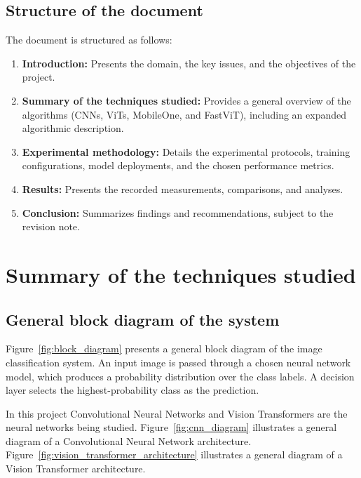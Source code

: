 \documentclass[12pt]{article}
\begin{document}
\subsection{Structure of the document}
The document is structured as follows:
\begin{enumerate}
    \item \textbf{Introduction:} Presents the domain, the key issues, and the objectives of the project.
    \item \textbf{Summary of the techniques studied:} Provides a general overview of the algorithms (CNNs, ViTs, MobileOne, and FastViT), including an expanded algorithmic description.
    \item \textbf{Experimental methodology:} Details the experimental protocols, training configurations, model deployments, and the chosen performance metrics.
    \item \textbf{Results:} Presents the recorded measurements, comparisons, and analyses.
    \item \textbf{Conclusion:} Summarizes findings and recommendations, subject to the revision note.
\end{enumerate}

\section{Summary of the techniques studied}

\subsection{General block diagram of the system}
Figure~\ref{fig:block_diagram} presents a general block diagram of the image classification system. An input image is passed through a chosen neural network model, which produces a probability distribution over the class labels. A decision layer selects the highest-probability class as the prediction.

In this project Convolutional Neural Networks and Vision Transformers are the neural networks being studied. Figure~\ref{fig:cnn_diagram} illustrates a general diagram of a Convolutional Neural Network architecture. Figure~\ref{fig:vision_transformer_architecture} illustrates a general diagram of a Vision Transformer architecture.
\end{document}
